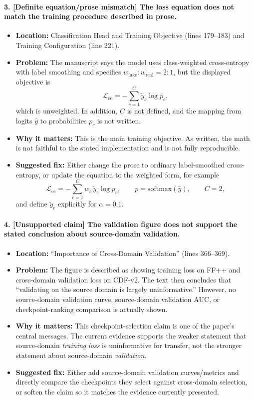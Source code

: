 \documentclass[11pt]{article}
\begin{document}
\paragraph{3. [Definite equation/prose mismatch] The loss equation does not match the training procedure described in prose.}
\begin{itemize}
    \item \textbf{Location:} Classification Head and Training Objective (lines 179--183) and Training Configuration (line 221).
    \item \textbf{Problem:} The manuscript says the model uses class-weighted cross-entropy with label smoothing and specifies $w_{\mathrm{fake}}:w_{\mathrm{real}} = 2:1$, but the displayed objective is
    \[
    \mathcal{L}_{\text{ce}} = - \sum_{c=1}^{C} \tilde{y}_c \log p_c,
    \]
    which is unweighted. In addition, $C$ is not defined, and the mapping from logits $\hat{y}$ to probabilities $p_c$ is not written.
    \item \textbf{Why it matters:} This is the main training objective. As written, the math is not faithful to the stated implementation and is not fully reproducible.
    \item \textbf{Suggested fix:} Either change the prose to ordinary label-smoothed cross-entropy, or update the equation to the weighted form, for example
    \[
    \mathcal{L}_{\text{ce}} = - \sum_{c=1}^{C} w_c \, \tilde{y}_c \log p_c,
    \qquad p = \mathrm{softmax}(\hat{y}),
    \qquad C = 2,
    \]
    and define $\tilde{y}_c$ explicitly for $\alpha = 0.1$.
\end{itemize}

\paragraph{4. [Unsupported claim] The validation figure does not support the stated conclusion about source-domain validation.}
\begin{itemize}
    \item \textbf{Location:} ``Importance of Cross-Domain Validation'' (lines 366--369).
    \item \textbf{Problem:} The figure is described as showing training loss on FF++ and cross-domain validation loss on CDF-v2. The text then concludes that ``validating on the source domain is largely uninformative.'' However, no source-domain validation curve, source-domain validation AUC, or checkpoint-ranking comparison is actually shown.
    \item \textbf{Why it matters:} This checkpoint-selection claim is one of the paper's central messages. The current evidence supports the weaker statement that source-domain \emph{training loss} is uninformative for transfer, not the stronger statement about source-domain \emph{validation}.
    \item \textbf{Suggested fix:} Either add source-domain validation curves/metrics and directly compare the checkpoints they select against cross-domain selection, or soften the claim so it matches the evidence currently presented.
\end{itemize}
\end{document}
